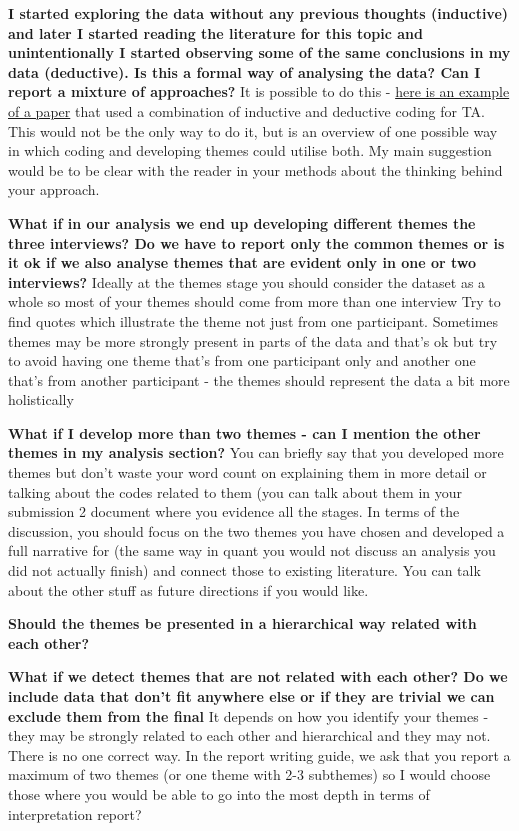 \documentclass[
  english,
  letterpaper,
  DIV=11,
  numbers=noendperiod]{scrreprt}
\begin{document}
\textbf{I started exploring the data without any previous thoughts
(inductive) and later I started reading the literature for this topic
and unintentionally I started observing some of the same conclusions in
my data (deductive). Is this a formal way of analysing the data? Can I
report a mixture of approaches?} It is possible to do this -
\href{https://journals.sagepub.com/doi/10.1177/160940690600500107\#}{here
is an example of a paper} that used a combination of inductive and
deductive coding for TA. This would not be the only way to do it, but is
an overview of one possible way in which coding and developing themes
could utilise both. My main suggestion would be to be clear with the
reader in your methods about the thinking behind your approach.

\textbf{What if in our analysis we end up developing different themes
the three interviews? Do we have to report only the common themes or is
it ok if we also analyse themes that are evident only in one or two
interviews?} Ideally at the themes stage you should consider the dataset
as a whole so most of your themes should come from more than one
interview Try to find quotes which illustrate the theme not just from
one participant. Sometimes themes may be more strongly present in parts
of the data and that's ok but try to avoid having one theme that's from
one participant only and another one that's from another participant -
the themes should represent the data a bit more holistically

\textbf{What if I develop more than two themes - can I mention the other
themes in my analysis section?} You can briefly say that you developed
more themes but don't waste your word count on explaining them in more
detail or talking about the codes related to them (you can talk about
them in your submission 2 document where you evidence all the stages. In
terms of the discussion, you should focus on the two themes you have
chosen and developed a full narrative for (the same way in quant you
would not discuss an analysis you did not actually finish) and connect
those to existing literature. You can talk about the other stuff as
future directions if you would like.

\textbf{Should the themes be presented in a hierarchical way related
with each other? }

\textbf{What if we detect themes that are not related with each other?
Do we include data that don't fit anywhere else or if they are trivial
we can exclude them from the final} It depends on how you identify your
themes - they may be strongly related to each other and hierarchical and
they may not. There is no one correct way. In the report writing guide,
we ask that you report a maximum of two themes (or one theme with 2-3
subthemes) so I would choose those where you would be able to go into
the most depth in terms of interpretation report?
\end{document}
